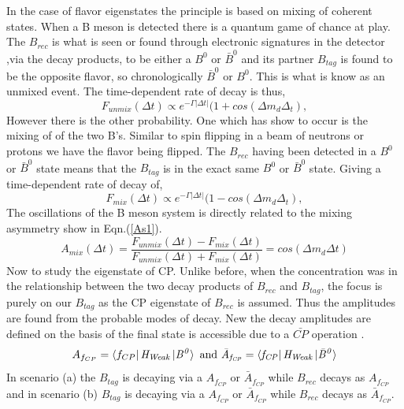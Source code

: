 In the case of flavor eigenstates the principle is based on mixing of coherent states. When a B meson is detected there is a quantum game of chance at play. The $B_{rec}$ is what is seen or found through electronic signatures in the detector ,via the decay products, to be either a $B^0$ or $\bar{B}^0$ and its partner $B_{tag}$ is found to be the opposite flavor, so chronologically $\bar{B}^0$ or $B^0$. This is what is know as an unmixed event. The time-dependent rate of decay is thus,
\begin{equation}\label{BPME13}
F_{unmix}(\Delta t) \propto e^{-\Gamma\left|\Delta t\right|}(1 + cos(\Delta m_d \Delta_t),
\end{equation}
However there is the other probability. One which has show to occur is the mixing of of the two B's. Similar to spin flipping in a beam of neutrons or protons we have the flavor being flipped. The $B_{rec}$ having been detected in a $B^0$ or $\bar{B}^0$ state means that the $B_{tag}$ is in the exact same $B^0$ or $\bar{B}^0$ state. Giving a time-dependent rate of decay of,
\begin{equation}\label{BPME14}
F_{mix}(\Delta t) \propto e^{-\Gamma\left|\Delta t\right|}(1 - cos(\Delta m_d \Delta_t),
\end{equation}
The oscillations of the B meson system is directly related to the mixing asymmetry show in Eqn.(\ref{As1}).
\begin{equation}\label{BPME15}
A_{mix}(\Delta t) = \frac{F_{unmix}(\Delta t)-F_{mix}(\Delta t)}{F_{unmix}(\Delta t)+F_{mix}(\Delta t)} = cos(\Delta m_d\Delta t) 
\end{equation}
Now to study the eigenstate of CP. Unlike before, when the concentration was in the relationship between the two decay products of $B_{rec}$ and $B_{tag}$, the focus is purely on our $B_{tag}$ as the CP eigenstate of $B_{rec}$ is assumed. Thus the amplitudes are found from the probable modes of decay. New the decay amplitudes are defined on the basis of the final state is accessible due to a $\bar{CP}$ operation \cite{B10}.
\begin{equation}\label{BPME16}
A_{f_{CP}}=\bra{f_{CP}}\it{H_{Weak}}\ket{B^{0}} \mbox{ and } \bar{A}_{f_{CP}}=\bra{f_{CP}}\it{H_{Weak}}\ket{\bar{B}^{0}}
\end{equation}
In scenario (a) the $B_{tag}$ is decaying via a $A_{f_{CP}}$ or $\bar{A}_{f_{CP}}$ while $B_{rec}$ decays as $A_{f_{CP}}$ and in scenario (b) $B_{tag}$ is decaying via a $A_{f_{CP}}$ or $\bar{A}_{f_{CP}}$ while $B_{rec}$ decays as $\bar{A}_{f_{CP}}$. 

